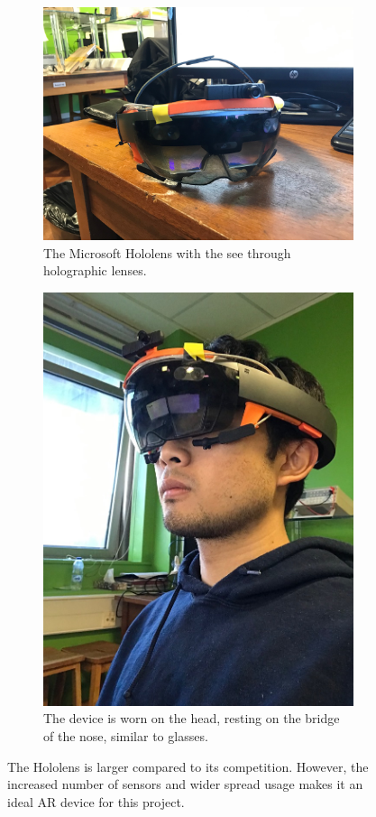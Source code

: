\begin{figure}[ht]
    \begin{subfigure}[b]{.45\textwidth}
        \centering
        \includegraphics[width=1.0\linewidth]{img/chapter5_implementation/hololensDevice.jpg}
        \caption{The Microsoft Hololens with the see through holographic lenses.}
    \end{subfigure}%
    \hspace{\fill} 
    \begin{subfigure}[b]{.45\textwidth}
        \centering
        \includegraphics[width=0.55\linewidth]{img/chapter5_implementation/hololensOnHead.jpg}
        \caption{The device is worn on the head, resting on the bridge of the nose, similar to glasses.}
    \end{subfigure}
    \vspace{-1\baselineskip}
    \begin{center}
        \caption{The Hololens is larger compared to its competition. However, the increased number of sensors and wider spread usage makes it an ideal AR device for this project.}
        \label{fig:holodevice}
    \end{center}
    \vspace{-2\baselineskip}
\end{figure}

